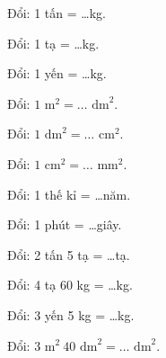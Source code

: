 \begin{ex}
Đổi: 1 tấn = \dots kg.
\end{ex}

\begin{ex}
Đổi: 1 tạ = \dots kg.
\end{ex}

\begin{ex}
Đổi: 1 yến = \dots kg.
\end{ex}

\begin{ex}
Đổi: $1\text{ m}^2 = \dots\text{ dm}^2$.
\end{ex}

\begin{ex}
Đổi: $1\text{ dm}^2 = \dots\text{ cm}^2$.
\end{ex}

\begin{ex}
Đổi: $1\text{ cm}^2 = \dots\text{ mm}^2$.
\end{ex}

\begin{ex}
Đổi: 1 thế kỉ = \dots năm.
\end{ex}

\begin{ex}
Đổi: 1 phút = \dots giây.
\end{ex}

\begin{ex}
Đổi: 2 tấn 5 tạ = \dots tạ.
\end{ex}

\begin{ex}
Đổi: 4 tạ 60 kg = \dots kg.
\end{ex}

\begin{ex}
Đổi: 3 yến 5 kg = \dots kg.
\end{ex}

\begin{ex}
Đổi: $3\text{ m}^2\ 40\text{ dm}^2 = \dots\text{ dm}^2$.
\end{ex}

